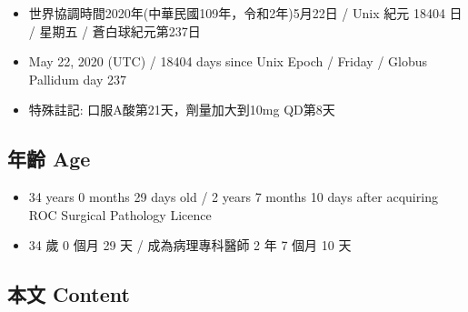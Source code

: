 \documentclass[a5paper, 11pt
]{book}
\providecommand{\tightlist}{%
  \setlength{\itemsep}{0pt}\setlength{\parskip}{0pt}}
\begin{document}
\begin{itemize}
\tightlist
\item
  世界協調時間2020年(中華民國109年，令和2年)5月22日 / Unix 紀元 18404 日
  / 星期五 / 蒼白球紀元第237日
\item
  May 22, 2020 (UTC) / 18404 days since Unix Epoch / Friday / Globus
  Pallidum day 237
\item
  特殊註記: 口服A酸第21天，劑量加大到10mg QD第8天
\end{itemize}

\hypertarget{ux5e74ux9f61-age-82}{%
\subsection{年齡 Age}\label{ux5e74ux9f61-age-82}}

\begin{itemize}
\tightlist
\item
  34 years 0 months 29 days old / 2 years 7 months 10 days after
  acquiring ROC Surgical Pathology Licence
\item
  34 歲 0 個月 29 天 / 成為病理專科醫師 2 年 7 個月 10 天
\end{itemize}

\hypertarget{ux672cux6587-content-82}{%
\subsection{本文 Content}\label{ux672cux6587-content-82}}
\end{document}
